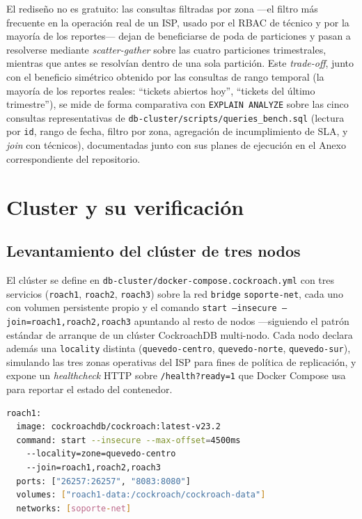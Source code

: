 \documentclass[11pt,letterpaper]{article}
\begin{document}
El rediseño no es gratuito: las consultas filtradas por zona —el filtro más frecuente en la
operación real de un ISP, usado por el RBAC de técnico y por la mayoría de los reportes— dejan de
beneficiarse de poda de particiones y pasan a resolverse mediante \emph{scatter-gather} sobre las
cuatro particiones trimestrales, mientras que antes se resolvían dentro de una sola partición. Este
\emph{trade-off}, junto con el beneficio simétrico obtenido por las consultas de rango temporal
(la mayoría de los reportes reales: ``tickets abiertos hoy'', ``tickets del último trimestre''), se
mide de forma comparativa con \texttt{EXPLAIN ANALYZE} sobre las cinco consultas representativas de
\texttt{db-cluster/scripts/queries\_bench.sql} (lectura por \texttt{id}, rango de fecha, filtro por
zona, agregación de incumplimiento de SLA, y \emph{join} con técnicos), documentadas junto con sus
planes de ejecución en el Anexo correspondiente del repositorio.

\section{Cluster y su verificación}
\label{sec:cluster-verificacion}

\subsection{Levantamiento del clúster de tres nodos}

El clúster se define en \texttt{db-cluster/docker-compose.cockroach.yml} con tres servicios
(\texttt{roach1}, \texttt{roach2}, \texttt{roach3}) sobre la red \texttt{bridge}
\texttt{soporte-net}, cada uno con volumen persistente propio y el comando
\texttt{start --insecure --join=roach1,roach2,roach3} apuntando al resto de nodos —siguiendo el
patrón estándar de arranque de un clúster CockroachDB multi-nodo. Cada nodo declara además una
\texttt{locality} distinta (\texttt{quevedo-centro}, \texttt{quevedo-norte},
\texttt{quevedo-sur}), simulando las tres zonas operativas del ISP para fines de política de
replicación, y expone un \emph{healthcheck} HTTP sobre \texttt{/health?ready=1} que Docker Compose
usa para reportar el estado del contenedor.

\begin{lstlisting}[language=bash, caption={Extracto de \texttt{docker-compose.cockroach.yml}: definición de un nodo}, label={lst:compose-crdb}]
roach1:
  image: cockroachdb/cockroach:latest-v23.2
  command: start --insecure --max-offset=4500ms
    --locality=zone=quevedo-centro
    --join=roach1,roach2,roach3
  ports: ["26257:26257", "8083:8080"]
  volumes: ["roach1-data:/cockroach/cockroach-data"]
  networks: [soporte-net]
\end{lstlisting}
\end{document}
